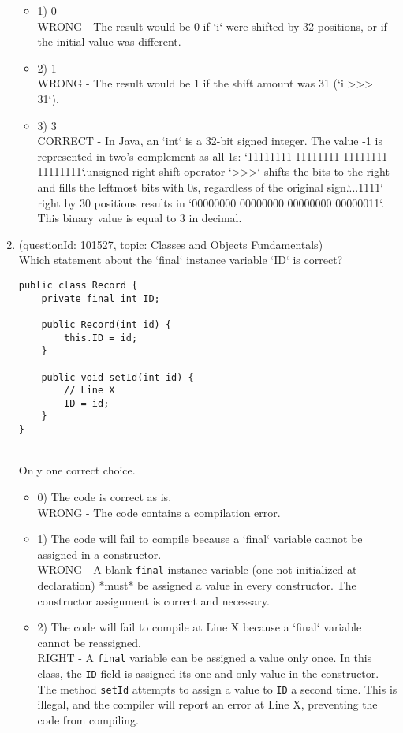 \documentclass[12pt]{article}
\begin{document}
\begin{enumerate}[label=(\arabic*)]
\begin{itemize}
\item 1) 0
 \\ 
WRONG - The result would be 0 if `i` were shifted by 32 positions, or if the initial value was different.

\item 2) 1
 \\ 
WRONG - The result would be 1 if the shift amount was 31 (`i >>> 31`).

\item 3) 3
 \\ 
CORRECT - In Java, an `int` is a 32-bit signed integer. The value -1 is represented in two's complement as all 1s: `11111111 11111111 11111111 11111111`.\nThe unsigned right shift operator `>>>` shifts the bits to the right and fills the leftmost bits with 0s, regardless of the original sign.\nShifting `...1111` right by 30 positions results in `00000000 00000000 00000000 00000011`. This binary value is equal to 3 in decimal.

\end{itemize}
\item (questionId: 101527, topic: Classes and Objects Fundamentals) \\ 
Which statement about the `final` instance variable `ID` is correct?\n\begin{verbatim}
public class Record {
    private final int ID;

    public Record(int id) {
        this.ID = id;
    }

    public void setId(int id) {
        // Line X
        ID = id;
    }
}
\end{verbatim}
\\ \noindent Only one correct choice. 
\begin{itemize}
\item 0) The code is correct as is.
 \\ 
WRONG - The code contains a compilation error.

\item 1) The code will fail to compile because a `final` variable cannot be assigned in a constructor.
 \\ 
WRONG - A blank \verb|final| instance variable (one not initialized at declaration) *must* be assigned a value in every constructor. The constructor assignment is correct and necessary.

\item 2) The code will fail to compile at Line X because a `final` variable cannot be reassigned.
 \\ 
RIGHT - A \verb|final| variable can be assigned a value only once. In this class, the \verb|ID| field is assigned its one and only value in the constructor. The method \verb|setId| attempts to assign a value to \verb|ID| a second time. This is illegal, and the compiler will report an error at Line X, preventing the code from compiling.


\end{itemize}
\end{enumerate}
\end{document}
